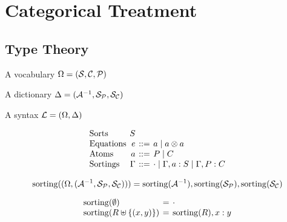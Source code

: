 \section{Categorical Treatment}
\label{sec:categorical}

\subsection{Type Theory}

A vocabulary $\Omega = (\Sorts, \Constructors, \Positions)$

A dictionary $\Delta = (\ArityInv, \Sp, \Sc)$

A syntax $\Sig = (\Omega, \Delta)$

\[
  \arraycolsep=2pt
  \begin{array}{lrcl}
    \text{Sorts}     & S                                                            \\
    \text{Equations} & e      & {::=} & a \mid a \otimes a                          \\
    \text{Atoms}     & a      & {::=} & P \mid C                                    \\
    \text{Sortings}  & \Gamma & {::=} & \cdot \mid \Gamma, a : S \mid \Gamma, P : C \\
  \end{array}
\]


\[
  \sorting((\Omega, (\ArityInv, \Sp, \Sc))) = \sorting(\ArityInv), \sorting(\Sp), \sorting(\Sc)
\]


\[
  \arraycolsep=2pt
  \begin{array}{lcl}
    \sorting(\EmptySet)               & = & \cdot              \\
    \sorting(R \uplus \Setof{(x, y)}) & = & \sorting(R), x : y \\
  \end{array}
\]


\begin{mathpar}


\end{mathpar}

